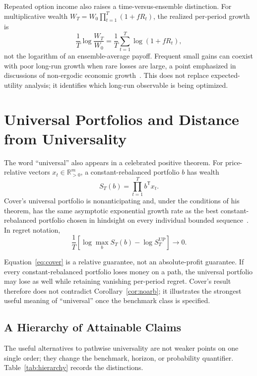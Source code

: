 \documentclass[aps,pra,reprint,superscriptaddress,amsmath,amssymb,floatfix]{revtex4-2}
\theoremstyle{plain}
\theoremstyle{definition}
\theoremstyle{remark}
\begin{document}
Repeated option income also raises a time-versus-ensemble distinction. For
multiplicative wealth \(W_T=W_0\prod_{t=1}^T(1+fR_t)\), the realized
per-period growth is
\[
  \frac1T\log\frac{W_T}{W_0}
  =\frac1T\sum_{t=1}^T\log(1+fR_t),
\]
not the logarithm of an ensemble-average payoff. Frequent small gains can
coexist with poor long-run growth when rare losses are large, a point emphasized
in discussions of non-ergodic economic growth~\cite{Peters2019}. This does not
replace expected-utility analysis; it identifies which long-run observable is
being optimized.

\section{Universal Portfolios and Distance from Universality}
\label{sec:cover}

The word ``universal'' also appears in a celebrated positive theorem.
For price-relative vectors \(x_t\in\mathbb{R}_{>0}^m\), a constant-rebalanced
portfolio \(b\) has wealth
\[
  S_T(b)=\prod_{t=1}^T b^\mathsf{T}x_t.
\]
Cover's universal portfolio is nonanticipating and, under the conditions of
his theorem, has the same asymptotic exponential growth rate as the best
constant-rebalanced portfolio chosen in hindsight on every individual bounded
sequence~\cite{Cover1991}. In regret notation,
\begin{equation}
  \frac1T\left[
  \log\max_{b}S_T(b)-\log S_T^{\mathrm{UP}}
  \right]\longrightarrow0.
  \label{eq:cover}
\end{equation}

Equation~\eqref{eq:cover} is a relative guarantee, not an absolute-profit
guarantee. If every constant-rebalanced portfolio loses money on a path, the
universal portfolio may lose as well while retaining vanishing per-period
regret. Cover's result therefore does not contradict
Corollary~\ref{cor:noarb}; it illustrates the strongest useful meaning of
``universal'' once the benchmark class is specified.

\subsection{A Hierarchy of Attainable Claims}

The useful alternatives to pathwise universality are not weaker points on one
single order; they change the benchmark, horizon, or probability quantifier.
Table~\ref{tab:hierarchy} records the distinctions.
\end{document}
